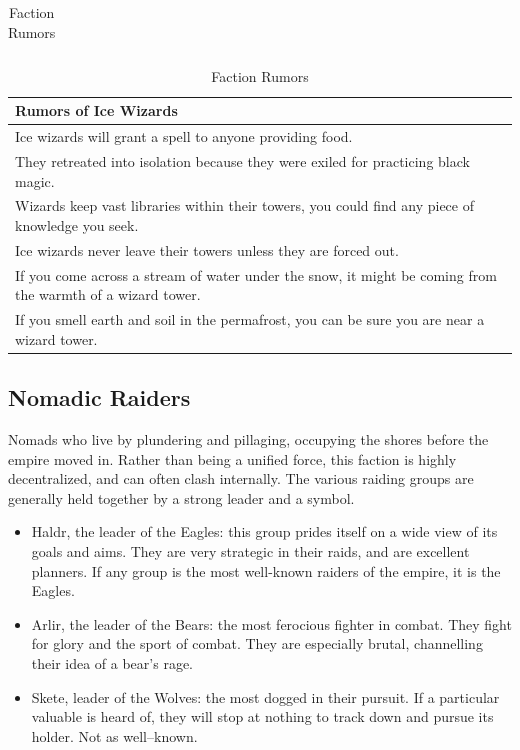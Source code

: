 \documentclass[notitlepage]{article}
\begin{document}
\begin{multicols}{2}
\begin{table}[t]
\begin{tabular}{|p{}|}
  \end{tabular} \begin{tabular}{|p{}|}
    \hline Rumors of Ice Wizards \\ \hline \hline
    Ice wizards will grant a spell to anyone providing food. \\ \hline
    They retreated into isolation because they were exiled for practicing black magic. \\ \hline
    Wizards keep vast libraries within their towers, you could find any piece of knowledge you seek. \\ \hline
    Ice wizards never leave their towers unless they are forced out. \\ \hline
    If you come across a stream of water under the snow, it might be coming from the warmth of a wizard tower. \\ \hline
    If you smell earth and soil in the permafrost, you can be sure you are near a wizard tower. \\ \hline
   \end{tabular}
   \caption{Faction Rumors}
  \label{tab:rumors}
\end{table}

  \subsection*{Nomadic Raiders}

  Nomads who live by plundering and pillaging, occupying the shores before the empire moved in.
  Rather than being a unified force, this faction is highly decentralized, and can often clash internally.
  The various raiding groups are generally held together by a strong leader and a symbol.

  \begin{itemize}
  \item Haldr, the leader of the Eagles: this group prides itself on a wide view of its goals and aims. They are very strategic in their raids, and are excellent planners. If any group is the most well-known raiders of the empire, it is the Eagles.
  \item Arlir, the leader of the Bears: the most ferocious fighter in combat. They fight for glory and the sport of combat. They are especially brutal, channelling their idea of a bear's rage.
  \item Skete, leader of the Wolves: the most dogged in their pursuit. If a particular valuable is heard of, they will stop at nothing to track down and pursue its holder. Not as well--known.
  \end{itemize}


\end{multicols}
\end{document}
